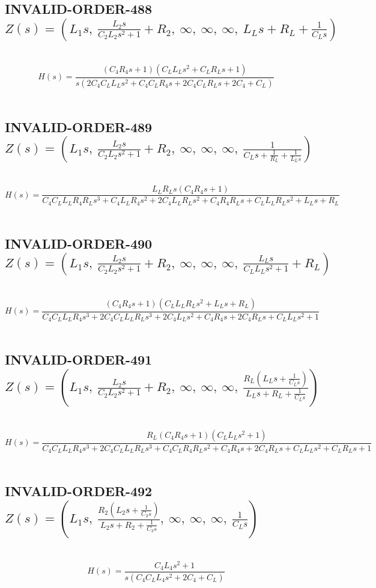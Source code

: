 \documentclass{article}
\begin{document}
\subsection{INVALID-ORDER-488 $Z(s) = \left( L_{1} s, \  \frac{L_{2} s}{C_{2} L_{2} s^{2} + 1} + R_{2}, \  \infty, \  \infty, \  \infty, \  L_{L} s + R_{L} + \frac{1}{C_{L} s}\right)$ } \ 
\textbf{\[H(s) = \frac{\left(C_{4} R_{4} s + 1\right) \left(C_{L} L_{L} s^{2} + C_{L} R_{L} s + 1\right)}{s \left(2 C_{4} C_{L} L_{L} s^{2} + C_{4} C_{L} R_{4} s + 2 C_{4} C_{L} R_{L} s + 2 C_{4} + C_{L}\right)}\] } \ 
\subsection{INVALID-ORDER-489 $Z(s) = \left( L_{1} s, \  \frac{L_{2} s}{C_{2} L_{2} s^{2} + 1} + R_{2}, \  \infty, \  \infty, \  \infty, \  \frac{1}{C_{L} s + \frac{1}{R_{L}} + \frac{1}{L_{L} s}}\right)$ } \ 
\textbf{\[H(s) = \frac{L_{L} R_{L} s \left(C_{4} R_{4} s + 1\right)}{C_{4} C_{L} L_{L} R_{4} R_{L} s^{3} + C_{4} L_{L} R_{4} s^{2} + 2 C_{4} L_{L} R_{L} s^{2} + C_{4} R_{4} R_{L} s + C_{L} L_{L} R_{L} s^{2} + L_{L} s + R_{L}}\] } \ 
\subsection{INVALID-ORDER-490 $Z(s) = \left( L_{1} s, \  \frac{L_{2} s}{C_{2} L_{2} s^{2} + 1} + R_{2}, \  \infty, \  \infty, \  \infty, \  \frac{L_{L} s}{C_{L} L_{L} s^{2} + 1} + R_{L}\right)$ } \ 
\textbf{\[H(s) = \frac{\left(C_{4} R_{4} s + 1\right) \left(C_{L} L_{L} R_{L} s^{2} + L_{L} s + R_{L}\right)}{C_{4} C_{L} L_{L} R_{4} s^{3} + 2 C_{4} C_{L} L_{L} R_{L} s^{3} + 2 C_{4} L_{L} s^{2} + C_{4} R_{4} s + 2 C_{4} R_{L} s + C_{L} L_{L} s^{2} + 1}\] } \ 
\subsection{INVALID-ORDER-491 $Z(s) = \left( L_{1} s, \  \frac{L_{2} s}{C_{2} L_{2} s^{2} + 1} + R_{2}, \  \infty, \  \infty, \  \infty, \  \frac{R_{L} \left(L_{L} s + \frac{1}{C_{L} s}\right)}{L_{L} s + R_{L} + \frac{1}{C_{L} s}}\right)$ } \ 
\textbf{\[H(s) = \frac{R_{L} \left(C_{4} R_{4} s + 1\right) \left(C_{L} L_{L} s^{2} + 1\right)}{C_{4} C_{L} L_{L} R_{4} s^{3} + 2 C_{4} C_{L} L_{L} R_{L} s^{3} + C_{4} C_{L} R_{4} R_{L} s^{2} + C_{4} R_{4} s + 2 C_{4} R_{L} s + C_{L} L_{L} s^{2} + C_{L} R_{L} s + 1}\] } \ 
\subsection{INVALID-ORDER-492 $Z(s) = \left( L_{1} s, \  \frac{R_{2} \left(L_{2} s + \frac{1}{C_{2} s}\right)}{L_{2} s + R_{2} + \frac{1}{C_{2} s}}, \  \infty, \  \infty, \  \infty, \  \frac{1}{C_{L} s}\right)$ } \ 
\textbf{\[H(s) = \frac{C_{4} L_{4} s^{2} + 1}{s \left(C_{4} C_{L} L_{4} s^{2} + 2 C_{4} + C_{L}\right)}\] } \ 
\end{document}
